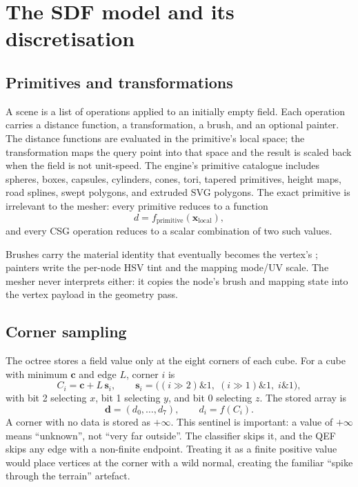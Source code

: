 \section{The SDF model and its discretisation}
\label{sec:sdf}

\subsection{Primitives and transformations}

A scene is a list of operations applied to an initially empty field.  Each
operation carries a distance function, a transformation, a brush, and an
optional painter.  The distance functions are evaluated in the primitive's
local space; the transformation maps the query point into that space and
the result is scaled back when the field is not unit-speed.  The engine's
primitive catalogue includes spheres, boxes, capsules, cylinders, cones,
tori, tapered primitives, height maps, road splines, swept polygons, and
extruded SVG polygons.  The exact primitive is irrelevant to the mesher:
every primitive reduces to a function
\begin{equation}
  d = f_{\text{primitive}}(\mathbf{x}_{\text{local}}),
\end{equation}
and every CSG operation reduces to a scalar combination of two such
values.

Brushes carry the material identity that eventually becomes the vertex's
; painters write the per-node HSV tint and the mapping
mode/UV scale.  The mesher never interprets either: it copies the node's
brush and mapping state into the vertex payload in the geometry pass.

\subsection{Corner sampling}

The octree stores a field value only at the eight corners of each cube.
For a cube with minimum $\mathbf{c}$ and edge $L$, corner $i$ is
\begin{equation}
  C_i = \mathbf{c} + L\,\mathbf{s}_i,
  \qquad
  \mathbf{s}_i = \bigl((i\gg2)\&1,\;(i\gg1)\&1,\;i\&1\bigr),
  \label{eq:corner}
\end{equation}
with bit 2 selecting $x$, bit 1 selecting $y$, and bit 0 selecting $z$.
The stored array is
\begin{equation}
  \mathbf{d} = (d_0,\ldots,d_7), \qquad d_i = f(C_i).
\end{equation}
A corner with no data is stored as $+\infty$.  This sentinel is important:
a value of $+\infty$ means ``unknown'', not ``very far outside''.  The
classifier skips it, and the QEF skips any edge with a non-finite
endpoint.  Treating it as a finite positive value would place vertices at
the corner with a wild normal, creating the familiar ``spike through the
terrain'' artefact.

